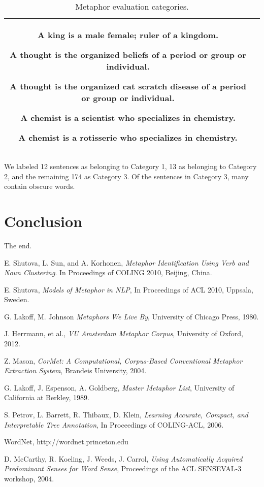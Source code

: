 \documentclass[12pt]{article}
\begin{document}
\begin{table}[h]
\begin{tabular}{|c|p{12cm}|}
        A king is a male female; ruler of a kingdom.\par
        \medskip
        A thought is the organized beliefs of a period or group or individual.\par
        A thought is the organized cat scratch disease of a period or group or individual.\par
        \medskip
        A chemist is a scientist who specializes in chemistry.\par
        A chemist is a rotisserie who specializes in chemistry.\par
		\\ \hline
	\end{tabular}
	\caption{Metaphor evaluation categories.}
	\label{tab:results}
\end{table}

We labeled 12 sentences as belonging to Category 1, 13 as belonging to Category 2, and the remaining 174 as Category 3. Of the sentences in Category 3, many contain obscure words.

\section{Conclusion}
The end.



\begin{thebibliography}{9}

  E. Shutova, L. Sun, and A. Korhonen,
  \emph{Metaphor Identification Using Verb and Noun Clustering}.
  In Proceedings of COLING 2010,
  Beijing, China.
  
  E. Shutova,
  \emph{Models of Metaphor in NLP},
  In Proceedings of ACL 2010,
  Uppsala, Sweden.
  
  G. Lakoff, M. Johnson
  \emph{Metaphors We Live By},
  University of Chicago Press, 1980.

  J. Herrmann, et al.,
  \emph{VU Amsterdam Metaphor Corpus},
  University of Oxford, 2012.

  Z. Mason,
  \emph{CorMet: A Computational, Corpus-Based Conventional Metaphor Extraction System},
  Brandeis University, 2004.

  G. Lakoff, J. Espenson, A. Goldberg,
  \emph{Master Metaphor List},
  University of California at Berkley, 1989.
  
  S. Petrov, L. Barrett, R. Thibaux, D. Klein,
  \emph{Learning Accurate, Compact, and Interpretable Tree Annotation},
  In Proceedings of COLING-ACL, 2006.

  WordNet, http://wordnet.princeton.edu

  D. McCarthy, R. Koeling, J. Weeds, J. Carrol,
  \emph{Using Automatically Acquired Predominant Senses for Word Sense},
  Proceedings of the ACL SENSEVAL-3 workshop, 2004.

\end{thebibliography}
\end{document}
